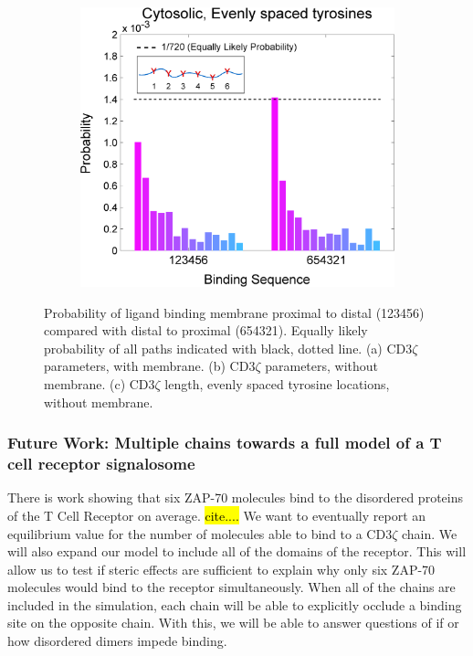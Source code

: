 \documentclass[../../AdvancementSummary.tex]{subfiles}
\begin{document}
\begin{figure}[H]
\begin{center}
\begin{subfigure}{0.3\linewidth}
			\caption{}
		\end{subfigure}
		\begin{subfigure}{0.3\linewidth}
			\includegraphics[width=\linewidth]{ResultsFigures/MultipleSequentialBinding/EvenSites/ProbVSSequence.eps}
			\caption{}
		\end{subfigure}
	\end{center}
	\caption{Probability of ligand binding membrane proximal to distal (123456) compared with distal to proximal (654321). Equally likely probability of all paths indicated with black, dotted line. (a) CD3$\zeta$ parameters, with membrane. (b) CD3$\zeta$ parameters, without membrane. (c) CD3$\zeta$ length, evenly spaced tyrosine locations, without membrane.}
\end{figure}

\subsubsection{Future Work: Multiple chains towards a full model of a T cell receptor signalosome}

There is work showing that six ZAP-70 molecules bind to the disordered proteins of the T Cell Receptor on average.  \hl{cite....} We want to eventually report an equilibrium value for the number of molecules able to bind to a CD3$\zeta$ chain. We will also expand our model to include all of the domains of the receptor. This will allow us to test if steric effects are sufficient to explain why only six ZAP-70 molecules would bind to the receptor simultaneously.  When all of the chains are included in the simulation, each chain will be able to explicitly occlude a binding site on the opposite chain. With this, we will be able to answer questions of if or how disordered dimers impede binding.
\end{document}
